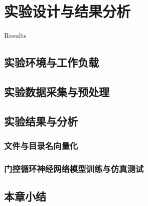 \chapter{实验设计与结果分析}
Results
\section{实验环境与工作负载}

\section{实验数据采集与预处理}
\section{实验结果与分析}
\subsection{文件与目录名向量化}
\subsection{门控循环神经网络模型训练与仿真测试}
\section{本章小结}